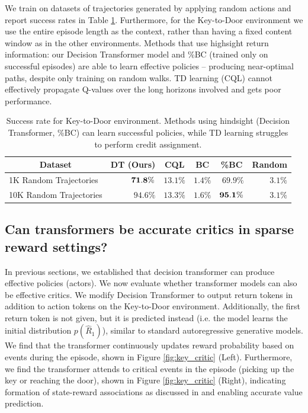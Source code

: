 We train on datasets of trajectories generated by applying random actions and report success rates in Table \ref{tbl:key_to_door}.
Furthermore, for the Key-to-Door environment we use the entire episode length as the context, rather than having a fixed content window as in the other environments.
Methods that use highsight return information: our Decision Transformer model and \%BC (trained only on successful episodes) are able to learn effective policies -- producing near-optimal paths, despite only training on random walks.
TD learning (CQL) cannot effectively propagate Q-values over the long horizons involved and gets poor performance.
\clearpage

\begin{table}[h]
\centering
\small
\begin{tabular}{lrrrrr}
\toprule
\multicolumn{1}{c}{\bf Dataset} & \multicolumn{1}{c}{\bf DT (Ours)} & \multicolumn{1}{c}{\bf CQL} & \multicolumn{1}{c}{\bf BC} & \multicolumn{1}{c}{\bf \%BC} & \multicolumn{1}{c}{\bf Random}\\
\midrule
1K Random Trajectories & $\bf{71.8}\%$ & $13.1\%$ & $1.4\%$ & $69.9\%$ & $3.1\%$      \\
10K Random Trajectories & $94.6\%$ & $13.3\%$ & $1.6\%$ & $\bf{95.1}\%$ & $3.1\%$      \\
\bottomrule
\end{tabular}
\caption{
Success rate for Key-to-Door environment.
Methods using hindsight (Decision Transformer, \%BC) can learn successful policies, while TD learning struggles to perform credit assignment.
}
\label{tbl:key_to_door}
\end{table}

\subsection{Can transformers be accurate critics in sparse reward settings?}

In previous sections, we established that decision transformer can produce effective policies (actors).
We now evaluate whether transformer models can also be effective critics.
We modify Decision Transformer to output return tokens in addition to action tokens on the Key-to-Door environment.
Additionally, the first return token is not given, but it is predicted instead (i.e. the model learns the initial distribution $p(\hat{R}_1)$), similar to standard autoregressive generative models.
We find that the transformer continuously updates reward probability based on events during the episode, shown in Figure \ref{fig:key_critic} (Left).
Furthermore, we find the transformer attends to critical events in the episode (picking up the key or reaching the door), shown in Figure \ref{fig:key_critic} (Right), indicating formation of state-reward associations as discussed in \citet{raposo2021synthetic} and enabling accurate value prediction.

